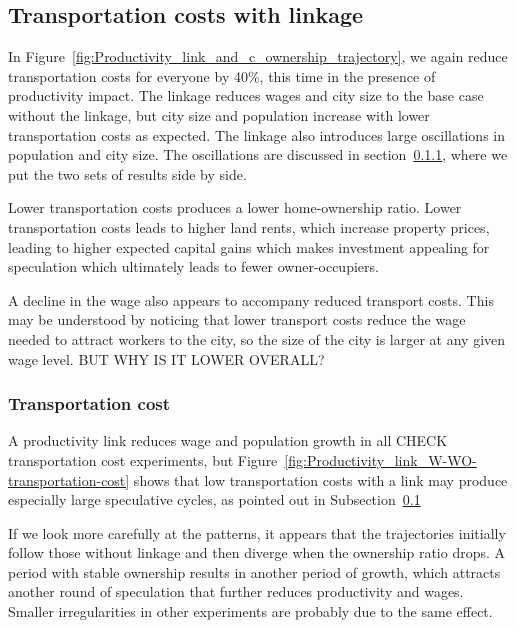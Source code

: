  \newpage

\subsection{Transportation costs  with linkage}\label{subsec-transport-link}

In Figure~\ref{fig:Productivity_link_and_c_ownership_trajectory}, we again reduce transportation costs for everyone by 40\%, this time in the presence of productivity impact. The linkage reduces wages and city size to the base case without the linkage, but city size and population increase with lower transportation costs as expected. The linkage also introduces large oscillations in population and city size. The oscillations are discussed in section~\ref{subsec-transport-pair}, where we put the two sets of results side by side. 





Lower transportation costs produces a lower home-ownership ratio. Lower transportation costs leads to higher land rents, which increase  property prices, leading to higher expected capital gains which makes investment appealing for speculation which ultimately leads to fewer owner-occupiers.

A decline in the wage also appears to accompany reduced transport costs. This may be understood by noticing that lower transport costs reduce the wage needed to attract workers to the city, so the size of the city is larger at any given wage level. {\color{red} BUT WHY IS IT LOWER OVERALL?} 

\subsubsection{Transportation cost}\label{subsec-transport-pair}

A productivity link reduces wage and population growth in all {\color{red}CHECK  transportation cost} experiments,  but Figure~\ref{fig:Productivity_link_W-WO-transportation-cost} shows that low transportation costs with a link may produce especially large speculative cycles, as pointed out in Subsection~\ref{subsec-transport-link} 

If we look more carefully at the patterns, it appears that the trajectories initially follow those without linkage and then diverge when the ownership ratio drops. A period with stable ownership results in another period of growth, which attracts another round of speculation that further reduces productivity and wages. Smaller irregularities in other experiments are probably due to the same effect.

